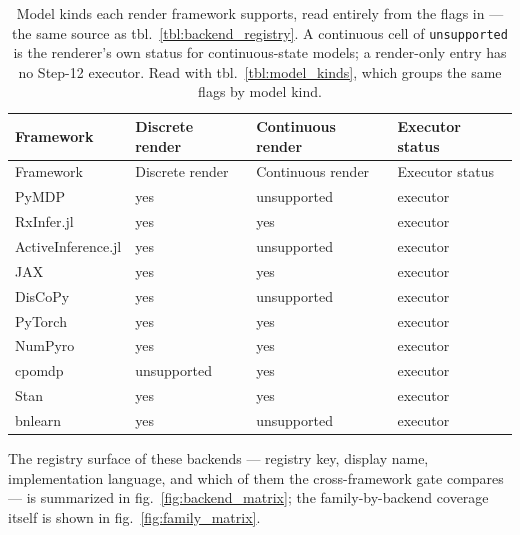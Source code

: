 \documentclass[
  english,
  9pt,
]{extarticle}
\begin{document}
\begin{longtable}[]{@{}llll@{}}
\caption{Model kinds each render framework supports, read entirely from
the flags in \protect{} ---
the same source as tbl.~\ref{tbl:backend_registry}. A continuous cell of
\protect\texttt{unsupported} is the renderer's own status for
continuous-state models; a render-only entry has no Step-12 executor.
Read with tbl.~\ref{tbl:model_kinds}, which groups the same flags by
model kind.}\label{tbl:framework_capability}\tabularnewline
\toprule\noalign{}
Framework & Discrete render & Continuous render & Executor status \\
\midrule\noalign{}
\endfirsthead
\toprule\noalign{}
Framework & Discrete render & Continuous render & Executor status \\
\midrule\noalign{}
\endhead
\bottomrule\noalign{}
\endlastfoot
PyMDP & yes & unsupported & executor \\
RxInfer.jl & yes & yes & executor \\
ActiveInference.jl & yes & unsupported & executor \\
JAX & yes & yes & executor \\
DisCoPy & yes & unsupported & executor \\
PyTorch & yes & yes & executor \\
NumPyro & yes & yes & executor \\
cpomdp & unsupported & yes & executor \\
Stan & yes & yes & executor \\
bnlearn & yes & unsupported & executor \\
\end{longtable}

The registry surface of these backends --- registry key, display name,
implementation language, and which of them the cross-framework gate
compares --- is summarized in fig.~\ref{fig:backend_matrix}; the
family-by-backend coverage itself is shown in
fig.~\ref{fig:family_matrix}.
\end{document}
